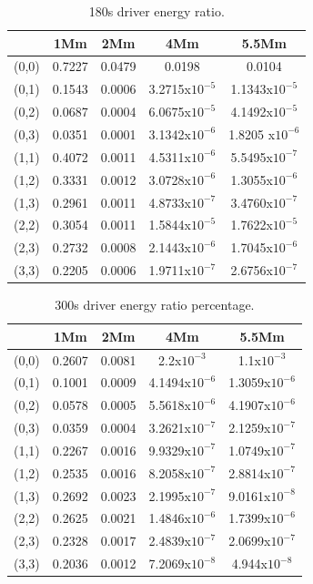 \documentclass[authoryear,final,1p]{elsarticle}
\begin{document}
\begin{table}
\centering
\begin{tabular}{c c c c c }
\hline
   &  1Mm & 2Mm & 4Mm & 5.5Mm \\
\hline
(0,0) &  0.7227 & 0.0479 & 0.0198 & 0.0104 \\
\hline
(0,1) & 0.1543 & 0.0006 & 3.2715x$10^{-5}$ &  1.1343x$10^{-5}$\\
\hline
(0,2) & 0.0687 & 0.0004 & 6.0675x$10^{-5}$ &  4.1492x$10^{-5}$\\
\hline
(0,3) & 0.0351 & 0.0001 & 3.1342x$10^{-6}$ & 1.8205 x$10^{-6}$\\
\hline
(1,1) & 0.4072 & 0.0011 & 4.5311x$10^{-6}$ &  5.5495x$10^{-7}$\\
\hline
(1,2) & 0.3331 & 0.0012 & 3.0728x$10^{-6}$ &  1.3055x$10^{-6}$\\
\hline
(1,3) & 0.2961 & 0.0011 & 4.8733x$10^{-7}$ &  3.4760x$10^{-7}$\\
\hline
(2,2) & 0.3054 & 0.0011 & 1.5844x$10^{-5}$ &  1.7622x$10^{-5}$\\
\hline
(2,3) & 0.2732 & 0.0008 & 2.1443x$10^{-6}$ &  1.7045x$10^{-6}$\\
\hline
(3,3) & 0.2205 & 0.0006 & 1.9711x$10^{-7}$ &  2.6756x$10^{-7}$\\
\hline
\end{tabular} 
\caption{ 180s driver energy ratio. }
\end{table}





\begin{table}
\centering
\begin{tabular}{c c c c c }
\hline
   &  1Mm & 2Mm & 4Mm & 5.5Mm \\
\hline
(0,0) &  0.2607 & 0.0081 & 2.2x$10^{-3}$ &  1.1x$10^{-3}$\\
\hline
(0,1) & 0.1001 & 0.0009 & 4.1494x$10^{-6}$ &  1.3059x$10^{-6}$\\
\hline
(0,2) & 0.0578 & 0.0005 & 5.5618x$10^{-6}$ &  4.1907x$10^{-6}$\\
\hline
(0,3) & 0.0359 & 0.0004 &3.2621x$10^{-7}$ &  2.1259x$10^{-7}$\\
\hline
(1,1) & 0.2267 & 0.0016 & 9.9329x$10^{-7}$ &  1.0749x$10^{-7}$\\
\hline
(1,2) & 0.2535 & 0.0016 & 8.2058x$10^{-7}$ &  2.8814x$10^{-7}$\\
\hline
(1,3) & 0.2692 & 0.0023 & 2.1995x$10^{-7}$ &  9.0161x$10^{-8}$\\
\hline
(2,2) & 0.2625 & 0.0021 & 1.4846x$10^{-6}$ &  1.7399x$10^{-6}$\\
\hline
(2,3) & 0.2328 & 0.0017 & 2.4839x$10^{-7}$ &  2.0699x$10^{-7}$\\
\hline
(3,3) & 0.2036 & 0.0012 & 7.2069x$10^{-8}$ &  4.944x$10^{-8}$\\
\hline
\end{tabular} 
\caption{ 300s driver energy ratio percentage. }
\end{table}
\end{document}
